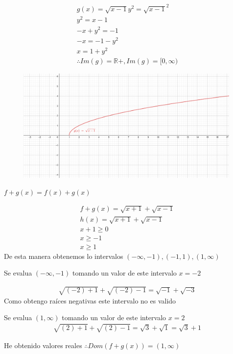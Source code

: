 \documentclass[12pt, letterpaper]{article}
\begin{document}
\begin{align*}
	g(x)= \sqrt{x-1}
	y^2 = {\sqrt{x-1}}^2\\
	y^2 = x-1\\
	-x+y^2 = -1\\
	-x= -1- y^2\\
	 x= 1+ y^2\\
	\therefore Im(g) = \mathbb{R}+, Im(g) = [0, \infty)
\end{align*}

\begin{figure}[h]
\centering
\includegraphics[width=30em]{t6dos}
\end{figure}

\textbf{$f+g(x) = f(x) + g(x)$}

\begin{align*}
	f+g(x) = \sqrt{x+1} + \sqrt{x-1}\\
	h(x) = \sqrt{x+1} + \sqrt{x-1}\\
	x + 1 \geq 0\\
	x \geq -1\\
	x  \geq 1
\end{align*}
De esta manera obtenemos lo intervalos $(-\infty, -1), (-1,1) , (1, \infty)$ 

Se evalua $(-\infty, -1)$ tomando un valor de este intervalo $x = -2$
	
\begin{align*}
	 \sqrt{(-2)+1} + \sqrt{(-2)-1} = 
	 \sqrt{-1} + \sqrt{-3}
\end{align*}
Como obtengo raíces negativas este intervalo no es valido

Se evalua $(1, \infty)$ tomando un valor de este intervalo $x = 2$
\begin{align*}
	 \sqrt{(2)+1} + \sqrt{(2)-1} = 
	 \sqrt{3} + \sqrt{1} = \sqrt{3} + 1
\end{align*}

He obtenido valores reales 	$\therefore Dom(f+g(x)) = (1, \infty)$
\end{document}
